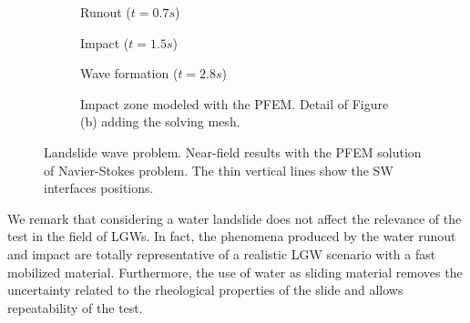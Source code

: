 \begin{figure}[p]
    \def\imgoffset{15ex}
    \centering
    \begin{subfigure}[c]{\columnwidth}
        \caption{Runout ($t=0.7s$)}
        \centering
        \label{t07pfemTest2}
    \end{subfigure}

    \begin{subfigure}[c]{\columnwidth}
        \caption{Impact ($t=1.5s$)}
        \centering
        \label{t15pfemTest2}
    \end{subfigure}

    \begin{subfigure}[c]{\columnwidth}
        \centering
        \caption{Wave formation ($t=2.8s$)}
        \label{t28pfemTest2}
    \end{subfigure}

    \begin{subfigure}[c]{\columnwidth}
        \centering
        \begin{minipage}[b]{0.35\textwidth}
            \caption{Impact zone modeled with the PFEM. Detail of Figure (b) adding the solving mesh. }
            \label{t07pfemTest2Zoom}
        \end{minipage}
        \begin{minipage}[c]{0.4\textwidth}
        \end{minipage}
    \end{subfigure}

    \caption{Landslide wave problem. Near-field results with the PFEM solution of Navier-Stokes problem. The thin vertical lines show the SW interfaces positions.}
    \label{PFEMresultsTest2}
\end{figure}




We remark that considering a water landslide does not affect the relevance of the test in the field of LGWs. In fact, the phenomena produced by the water runout and impact are totally representative of a realistic LGW scenario with a fast mobilized material. Furthermore, the use of water as sliding material removes the uncertainty related to the rheological properties of the slide and allows repeatability of the test. 

